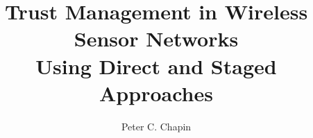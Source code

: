 \documentclass[11pt]{report}
\newcommand{\primaryspacing}{\doublespace}
\begin{document}
\title{Trust Management in Wireless Sensor Networks\\Using Direct and Staged Approaches}
\author{Peter C. Chapin}
\maketitle

\makeacceptance
{}






\singlespace

\tableofcontents
\clearpage

\listoftables
\clearpage

\listoffigures
\clearpage

%

\primaryspacing










\appendix

%






\primaryspacing

%
\end{document}
